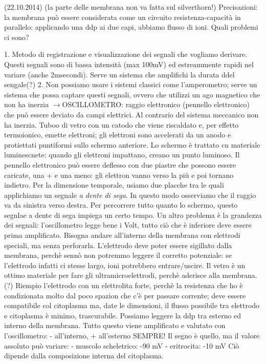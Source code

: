 \documentclass[a4paper,12pt]{article}
\newcommand{\freccia}{\ensuremath{\rightarrow}}
\begin{document}
(22.10.2014)
(la parte delle membrana non va fatta sul silverthorn!)
Precisazioni:
la membrana può essere considerata come un circuito resistenza-capacità in parallelo: applicando una ddp ai due capi, abbiamo flusso di ioni. Quali problemi ci sono?

1. Metodo di registrazione e visualizzazione dei segnali che vogliamo derivare. Questi segnali sono di bassa intensità (max 100mV) ed estreammente rapidi nel variare (anche 2msecondi). Serve un sistema che amplifichi la durata ddel sengale(?)
2. Non possiamo usare i sistemi classici come l'amperometro; serve un sistema che possa captare questi segnali, ovvero che utilizzi un ago magnetico che non ha inerzia \freccia OSCILLOMETRO: raggio elettronico (pennello elettronico) che può essere deviato da campi elettrici. Al contrario del sistema meccanico non ha inerzia. Tuboo di vetro con un catodo che viene riscaldato e, per effetto termoionico, emette elettroni; gli elettroni sono accelerati da un anodo e protiettati puntiformi sullo schermo anteriore. Lo schermo è trattato cn materiale luminescnete: quando gli elettroni impattano, creano un punto luminoso.
Il pennello elettronico può essere deflesso con due piastre che possono essere caricate, una + e una meno: gli elettron vanno verso la più e poi tornano indietro.
Per la dimensione temporale, usiamo due placche tra le quali applichiamo un segnale \emph{a dente di sega}. In questo modo osserviamo che il raggio va da sinistra verso destra. Per percorrere tutto quanto lo schermo, questo segnlae a dente di sega impiega un certo tempo.
Un altro problema è la grandezza dei segnali: l'oscillometro legge bene i Volt, tutto ciò che è inferiore deve essere prima amplificato.
Bisogna andare all'interno della membrana con elettrodi speciali, ma senza perforarla. L'elettrodo deve poter essere sigillato dalla membrana, perchè sennò non potremmo leggere il corretto potenziale: se l'elettrodo infatti ci stesse largo, ioni potrebbero entrare/uscire. Il vetro è un ottimo materiale per fare gli ultramicroelettrodi, perchè aderisce alla membrana. (?)
Riempio l'elettrodo con un elettrolita forte, perchè la resistenza che ho è condizionata molto dal poco spazion che c'è per passare corrente; deve essere compatibile col citoplasma ma, date le dimensioni, il flusso possibile tra elettrodo e citoplasma è minimo, trascurabile.
Possiamo leggere la ddp tra esterno ed interno della membrana. Tutto questo viene amplificato e valutato con l'oscillometro: - all'interno, + all'esterno SEMPRE! Il segno è quello, ma il valore assoluto può variare:
- muscolo scheletrico: -90 mV
- eritrocita: -10 mV
Ciò dipende dalla composizione interna del citoplasma.
\end{document}
